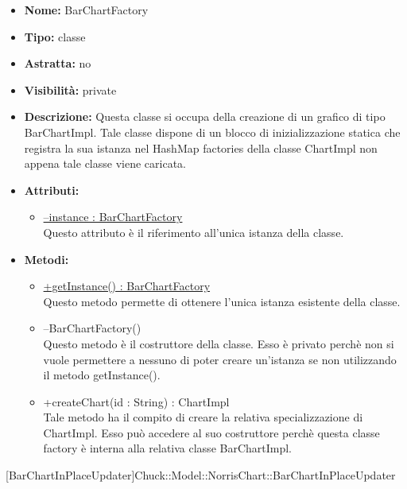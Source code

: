 			
			\begin{itemize}
			\item \textbf{Nome:} BarChartFactory
			\item \textbf{Tipo:} classe
			
		\item \textbf{Astratta:}
		no
			\item \textbf{Visibilità:} private
			\item \textbf{Descrizione:} Questa classe si occupa della creazione di un grafico di tipo BarChartImpl. Tale classe dispone di un blocco di inizializzazione statica che registra la sua istanza nel HashMap factories della classe ChartImpl non appena tale classe viene caricata.
			\item \textbf{Attributi:}
				\begin{itemize}
				\setlength{\itemsep}{5pt}
				
					\item[\ding{111}] \underline{--instance : BarChartFactory} \\ [1mm] Questo attributo è il riferimento all'unica istanza della classe.
				\end{itemize}
		
			\item \textbf{Metodi:}
				\begin{itemize}
				\setlength{\itemsep}{5pt}
				
					\item[\ding{111}] {\underline{+getInstance() : BarChartFactory}} \\ [1mm] Questo metodo permette di ottenere l'unica istanza esistente della classe.
					\item[\ding{111}] {{--BarChartFactory()}} \\ [1mm] Questo metodo è il costruttore della classe. Esso è privato perchè non si vuole permettere a nessuno di poter creare un’istanza se non utilizzando il metodo getInstance().
					\item[\ding{111}] {{+createChart(id : String) : ChartImpl}} \\ [1mm] Tale metodo ha il compito di creare la relativa specializzazione di ChartImpl. Esso può accedere al suo costruttore perchè questa classe factory è interna alla relativa classe BarChartImpl.
				\end{itemize}
		
			\end{itemize}

			
			[BarChartInPlaceUpdater]{Chuck::Model::NorrisChart::BarChartInPlaceUpdater}
			

